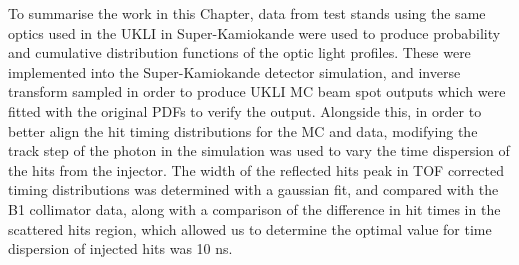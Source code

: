 To summarise the work in this Chapter, data from test stands using the same optics used in the UKLI in Super-Kamiokande were used to produce probability and cumulative distribution functions of the optic light profiles. These were implemented into the Super-Kamiokande detector simulation, and inverse transform sampled in order to produce UKLI MC beam spot outputs which were fitted with the original PDFs to verify the output. Alongside this, in order to better align the hit timing distributions for the MC and data, modifying the track step of the photon in the simulation was used to vary the time dispersion of the hits from the injector. The width of the reflected hits peak in TOF corrected timing distributions was determined with a gaussian fit, and compared with the B1 collimator data, along with a comparison of the difference in hit times in the scattered hits region, which allowed us to determine the optimal value for time dispersion of injected hits was 10 ns.
